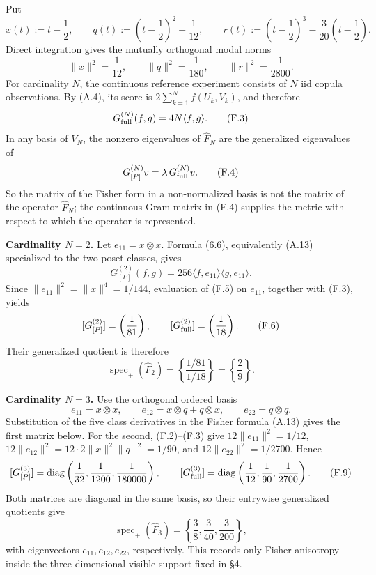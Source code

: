 \documentclass[11pt]{article}
\begin{document}
Put \[ x(t):=t-\frac12,\qquad q(t):=\left(t-\frac12\right)^2-\frac1{12},\qquad r(t):=\left(t-\frac12\right)^3       -\frac3{20}\left(t-\frac12\right). \tag{F.1} \] Direct integration gives the mutually orthogonal modal norms \[ \|x\|^2=\frac1{12},\qquad \|q\|^2=\frac1{180},\qquad \|r\|^2=\frac1{2800}. \tag{F.2} \] For cardinality \(N\), the continuous reference experiment consists of \(N\) iid copula observations. By (A.4), its score is \(2\sum_{k=1}^N f(U_k,V_k)\), and therefore \[ G_{\rm full}^{(N)}(f,g)=4N\langle f,g\rangle. \tag{F.3} \] In any basis of \(V_N\), the nonzero eigenvalues of \(\widehat F_N\) are the generalized eigenvalues of \[ G_{[P]}^{(N)}v=\lambda\,G_{\rm full}^{(N)}v. \tag{F.4} \] So the matrix of the Fisher form in a non-normalized basis is not the matrix of the operator \(\widehat F_N\); the continuous Gram matrix in (F.4) supplies the metric with respect to which the operator is represented.

\textbf{Cardinality \(N=2\).} Let \(e_{11}=x\otimes x\). Formula (6.6), equivalently (A.13) specialized to the two poset classes, gives \[ G_{[P]}^{(2)}(f,g) =256\langle f,e_{11}\rangle\langle g,e_{11}\rangle. \tag{F.5} \] Since \(\|e_{11}\|^2=\|x\|^4=1/144\), evaluation of (F.5) on \(e_{11}\), together with (F.3), yields \[ [G_{[P]}^{(2)}]=\left(\frac1{81}\right), \qquad [G_{\rm full}^{(2)}]=\left(\frac1{18}\right). \tag{F.6} \] Their generalized quotient is therefore \[ \operatorname{spec}_+(\widehat F_2) =\left\{\frac{1/81}{1/18}\right\} =\left\{\frac29\right\}. \tag{F.7} \]

\textbf{Cardinality \(N=3\).} Use the orthogonal ordered basis \[ e_{11}=x\otimes x,\qquad e_{12}=x\otimes q+q\otimes x,\qquad e_{22}=q\otimes q. \tag{F.8} \] Substitution of the five class derivatives in the Fisher formula (A.13) gives the first matrix below. For the second, (F.2)--(F.3) give \(12\|e_{11}\|^2=1/12\), \(12\|e_{12}\|^2=12\cdot2\|x\|^2\|q\|^2=1/90\), and \(12\|e_{22}\|^2=1/2700\). Hence \[ [G_{[P]}^{(3)}] =\operatorname{diag}\left( \frac1{32},\frac1{1200},\frac1{180000} \right), \qquad [G_{\rm full}^{(3)}] =\operatorname{diag}\left( \frac1{12},\frac1{90},\frac1{2700} \right). \tag{F.9} \] Both matrices are diagonal in the same basis, so their entrywise generalized quotients give \[ \operatorname{spec}_+(\widehat F_3) =\left\{\frac38,\frac3{40},\frac3{200}\right\}, \tag{F.10} \] with eigenvectors \(e_{11},e_{12},e_{22}\), respectively. This records only Fisher anisotropy inside the three-dimensional visible support fixed in \S4.
\end{document}
